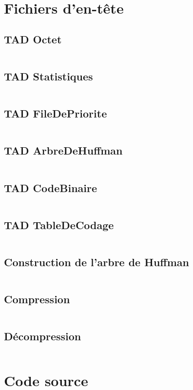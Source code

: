 \section{Fichiers d'en-tête}
    \subsection{TAD Octet}
        \inputminted[breaklines]{c}{../include/octet.h}
    \subsection{TAD Statistiques}
        \inputminted[breaklines]{c}{../include/statistiques.h}
    \subsection{TAD FileDePriorite}
        \inputminted[breaklines]{c}{../include/fileDePrioriteDArbreDeHuffman.h}
    \subsection{TAD ArbreDeHuffman}
        \inputminted[breaklines]{c}{../include/arbreDeHuffman.h}
    \subsection{TAD CodeBinaire}
        \inputminted[breaklines]{c}{../include/codeBinaire.h}
    \subsection{TAD TableDeCodage}
        \inputminted[breaklines]{c}{../include/tableDeCodage.h}
    \subsection{Construction de l'arbre de Huffman}
        \inputminted[breaklines]{c}{../include/construireArbreDeHuffman.h}
    \subsection{Compression}
        \inputminted[breaklines]{c}{../include/compression.h}
    \subsection{Décompression}
        \inputminted[breaklines]{c}{../include/decompression.h} 

\newpage
\section{Code source}
